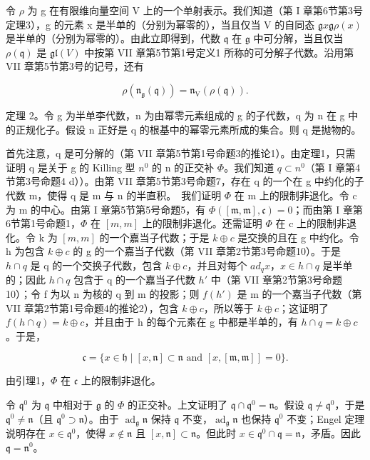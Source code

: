 令 \(\rho\) 为 g 在有限维向量空间 V 上的一个单射表示。我们知道（第 I 章第6节第3号定理3），g 的元素 x 是半单的（分别为幂零的），当且仅当 V 的自同态 \(\mathfrak{g}\)\(x\)\(\mathfrak{g}\)\(\rho(x)\) 是半单的（分别为幂零的）。由此立即得到，代数 \(\mathfrak{q}\) 在 \(\mathfrak{g}\) 中可分解，当且仅当 \(\rho(\mathfrak{q})\) 是 \(\mathfrak{gl}(V)\) 中按第 VII 章第5节第1号定义1 所称的可分解子代数。沿用第 VII 章第5节第3号的记号，还有

\[
\rho (\mathfrak {n} _ {\mathfrak {g}} (\mathfrak {q})) = \mathfrak {n} _ {\mathrm{V}} (\rho (\mathfrak {q})).
\]

定理 2。令 g 为半单李代数，n 为由幂零元素组成的 g 的子代数，q 为 n 在 g 中的正规化子。假设 n 正好是 q 的根基中的幂零元素所成的集合。则 q 是抛物的。

首先注意，q 是可分解的（第 VII 章第5节第1号命题3的推论1）。由定理1，只需证明 q 是关于 g 的 Killing 型 \(n^{0}\) 的 n 的正交补 \(\varPhi\)。我们知道 \(q \subset n^{0}\)（第 I 章第4节第3号命题4 d））。由第 VII 章第5节第3号命题7，存在 q 的一个在 g 中约化的子代数 m，使得 q 是 m 与 n 的半直积。~我们证明 \(\varPhi\) 在 m 上的限制非退化。令 c 为 m 的中心。由第 I 章第5节第5号命题5，有 \(\Phi([\mathfrak{m},\mathfrak{m}],\mathfrak{c})=0\)；而由第 I 章第6节第1号命题1，\(\Phi\) 在 \([m,m]\) 上的限制非退化。还需证明 \(\Phi\) 在 c 上的限制非退化。令 k 为 \([m,m]\) 的一个嘉当子代数；于是 \(k\oplus c\) 是交换的且在 g 中约化。令 h 为包含 \(k\oplus c\) 的 g 的一个嘉当子代数（第 VII 章第2节第3号命题10）。于是 \(h\cap q\) 是 q 的一个交换子代数，包含 \(k\oplus c\)，并且对每个 \(ad_{q}x\)，\(x\in h\cap q\) 是半单的；因此 \(h\cap q\) 包含于 q 的一个嘉当子代数 \(h'\) 中（第 VII 章第2节第3号命题10）；令 f 为以 n 为核的 q 到 m 的投影；则 \(f(h')\) 是 m 的一个嘉当子代数（第 VII 章第2节第1号命题4的推论2），包含 \(k\oplus c\)，所以等于 \(k\oplus c\)；这证明了 \(f(h\cap q)=k\oplus c\)，并且由于 h 的每个元素在 g 中都是半单的，有 \(h\cap q=k\oplus c\)。于是，

\[
\mathfrak {c} = \{x \in \mathfrak {h} \mid [ x, \mathfrak {n} ] \subset \mathfrak {n} \text {   and   } [ x, [ \mathfrak {m}, \mathfrak {m} ] ] = 0 \}.
\]

由引理1，\(\varPhi\) 在 \(\mathfrak{c}\) 上的限制非退化。

令 \(\mathfrak{q}^0\) 为 \(\mathfrak{q}\) 中相对于 \(\mathfrak{g}\) 的 \(\varPhi\) 的正交补。上文证明了 \(\mathfrak{q} \cap \mathfrak{q}^0 = \mathfrak{n}\)。假设 \(\mathfrak{q} \neq \mathfrak{q}^0\)，于是 \(\mathfrak{q}^0 \neq \mathfrak{n}\)（且 \(\mathfrak{q}^0 \supset \mathfrak{n}\)）。由于 \(\operatorname{ad}_{\mathfrak{g}} \mathfrak{n}\) 保持 \(\mathfrak{q}\) 不变，\(\operatorname{ad}_{\mathfrak{g}} \mathfrak{n}\) 也保持 \(\mathfrak{q}^0\) 不变；Engel 定理说明存在 \(x \in \mathfrak{q}^0\)，使得 \(x \notin \mathfrak{n}\) 且 \([x, \mathfrak{n}] \subset \mathfrak{n}\)。但此时 \(x \in \mathfrak{q}^0 \cap \mathfrak{q} = \mathfrak{n}\)，矛盾。因此 \(\mathfrak{q} = \mathfrak{n}^0\)。

